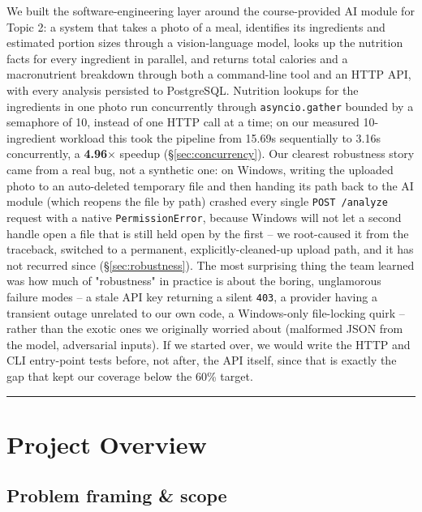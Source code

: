 \documentclass[11pt,a4paper]{article}
\begin{document}
We built the software-engineering layer around the course-provided AI module for Topic 2: a system that takes a photo of a meal, identifies its ingredients and estimated portion sizes through a vision-language model, looks up the nutrition facts for every ingredient in parallel, and returns total calories and a macronutrient breakdown through both a command-line tool and an HTTP API, with every analysis persisted to PostgreSQL. Nutrition lookups for the ingredients in one photo run concurrently through \texttt{asyncio.gather} bounded by a semaphore of 10, instead of one HTTP call at a time; on our measured 10-ingredient workload this took the pipeline from 15.69s sequentially to 3.16s concurrently, a \textbf{4.96$\times$} speedup (\S\ref{sec:concurrency}). Our clearest robustness story came from a real bug, not a synthetic one: on Windows, writing the uploaded photo to an auto-deleted temporary file and then handing its path back to the AI module (which reopens the file by path) crashed every single \texttt{POST /analyze} request with a native \texttt{PermissionError}, because Windows will not let a second handle open a file that is still held open by the first -- we root-caused it from the traceback, switched to a permanent, explicitly-cleaned-up upload path, and it has not recurred since (\S\ref{sec:robustness}). The most surprising thing the team learned was how much of "robustness" in practice is about the boring, unglamorous failure modes -- a stale API key returning a silent \texttt{403}, a provider having a transient outage unrelated to our own code, a Windows-only file-locking quirk -- rather than the exotic ones we originally worried about (malformed JSON from the model, adversarial inputs). If we started over, we would write the HTTP and CLI entry-point tests before, not after, the API itself, since that is exactly the gap that kept our coverage below the 60\% target.

\tableofcontents
\vspace{0.6em}\hrule\vspace{0.4em}

\section{Project Overview}

\subsection{Problem framing \& scope}
\end{document}
